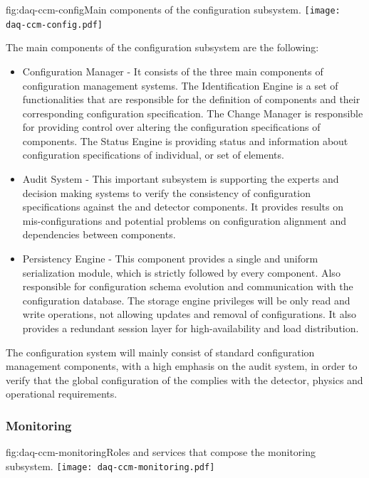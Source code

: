 \begin{dunefigure}{fig:daq-ccm-config}{Main components of the  configuration subsystem.}
  \texttt{[image: daq-ccm-config.pdf]}
\end{dunefigure}

The main components of the configuration subsystem are the following:
\begin{itemize}
\item Configuration Manager - It consists of the three main components of configuration management systems. The Identification Engine is a set of functionalities that are responsible for the definition of  components and their corresponding configuration specification. The Change Manager is responsible for providing control over altering the configuration specifications of components. The Status Engine is providing status and information about configuration specifications of individual, or set of  elements.
\item Audit System - This important subsystem is supporting the experts and decision making systems to verify the consistency of configuration specifications against the  and detector components. It provides results on mis-configurations and potential problems on configuration alignment and dependencies between components.
\item Persistency Engine - This component provides a single and uniform serialization module, which is strictly followed by every  component. Also responsible for configuration schema evolution and communication with the configuration database. The storage engine privileges will be only read and write operations, not allowing updates and removal of configurations. It also provides a redundant session layer for high-availability and load distribution.
\end{itemize}

The configuration system will mainly consist of standard configuration management components, with a high emphasis on the audit system, in order to verify that the global configuration of the  complies with the detector, physics and operational requirements.

\subsubsection{Monitoring}
\label{sec:daq:design:ccm:monitoring}

\begin{dunefigure}{fig:daq-ccm-monitoring}{Roles and services that compose the  monitoring subsystem.}
  \texttt{[image: daq-ccm-monitoring.pdf]}
\end{dunefigure}

